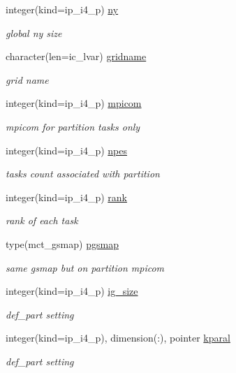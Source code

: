 \begin{DoxyCompactItemize}
integer(kind=ip\+\_\+i4\+\_\+p) \hyperlink{structmod__oasis__part_1_1prism__part__type_a4169783dee96aa9c60d43826daf6000c}{ny}
\begin{DoxyCompactList}\small\item\em global ny size \end{DoxyCompactList}\item 
character(len=ic\+\_\+lvar) \hyperlink{structmod__oasis__part_1_1prism__part__type_a4507d4efc53b93149a44bf44d12c9e56}{gridname}
\begin{DoxyCompactList}\small\item\em grid name \end{DoxyCompactList}\item 
integer(kind=ip\+\_\+i4\+\_\+p) \hyperlink{structmod__oasis__part_1_1prism__part__type_a5aaf8efdc7391d2a64f269dd97055612}{mpicom}
\begin{DoxyCompactList}\small\item\em mpicom for partition tasks only \end{DoxyCompactList}\item 
integer(kind=ip\+\_\+i4\+\_\+p) \hyperlink{structmod__oasis__part_1_1prism__part__type_a3f129d8d5ee4ccf7b071febc1c3f37c3}{npes}
\begin{DoxyCompactList}\small\item\em tasks count associated with partition \end{DoxyCompactList}\item 
integer(kind=ip\+\_\+i4\+\_\+p) \hyperlink{structmod__oasis__part_1_1prism__part__type_a1bf56b7dcc55c07cab5d1be13d33cfdd}{rank}
\begin{DoxyCompactList}\small\item\em rank of each task \end{DoxyCompactList}\item 
type(mct\+\_\+gsmap) \hyperlink{structmod__oasis__part_1_1prism__part__type_ace66d3bf592452e56ffe202df3a09310}{pgsmap}
\begin{DoxyCompactList}\small\item\em same gsmap but on partition mpicom \end{DoxyCompactList}\item 
integer(kind=ip\+\_\+i4\+\_\+p) \hyperlink{structmod__oasis__part_1_1prism__part__type_a68188f6203fd3a54b307f3074cd01957}{ig\+\_\+size}
\begin{DoxyCompactList}\small\item\em def\+\_\+part setting \end{DoxyCompactList}\item 
integer(kind=ip\+\_\+i4\+\_\+p), dimension(\+:), pointer \hyperlink{structmod__oasis__part_1_1prism__part__type_a32de1a0439c69db4f6b4d42839ad4202}{kparal}
\begin{DoxyCompactList}\small\item\em def\+\_\+part setting \end{DoxyCompactList}\end{DoxyCompactItemize}



